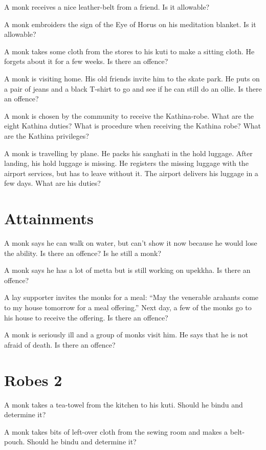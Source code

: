 A monk receives a nice leather-belt from a friend. Is it allowable?

A monk embroiders the sign of the Eye of Horus on his meditation
blanket. Is it allowable?

A monk takes some cloth from the stores to his kuti to make a sitting
cloth. He forgets about it for a few weeks. Is there an offence?

A monk is visiting home. His old friends invite him to the skate park.
He puts on a pair of jeans and a black T-shirt to go and see if he can
still do an ollie. Is there an offence?

A monk is chosen by the community to receive the Kathina-robe. What are
the eight Kathina duties? What is procedure when receiving the Kathina
robe? What are the Kathina privileges?

A monk is travelling by plane. He packs his sanghati in the hold
luggage. After landing, his hold luggage is missing. He registers the
missing luggage with the airport services, but has to leave without it.
The airport delivers his luggage in a few days. What are his duties?

\section{Attainments}

A monk says he can walk on water, but can't show it now because he would
lose the ability. Is there an offence? Is he still a monk?

A monk says he has a lot of metta but is still working on upekkha. Is
there an offence?

A lay supporter invites the monks for a meal: ``May the venerable
arahants come to my house tomorrow for a meal offering.'' Next day, a
few of the monks go to his house to receive the offering. Is there an
offence?

A monk is seriously ill and a group of monks visit him. He says that he
is not afraid of death. Is there an offence?

\section{Robes 2}

A monk takes a tea-towel from the kitchen to his kuti. Should he bindu
and determine it?

A monk takes bits of left-over cloth from the sewing room and makes a
belt-pouch. Should he bindu and determine it?

